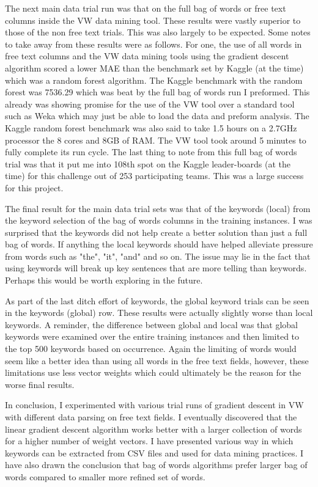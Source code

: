 \documentclass[conference]{IEEEtran}
\begin{document}
The next main data trial run was that on the full bag of words or free text
columns inside the VW data mining tool. These results were vastly superior to
those of the non free text trials. This was also largely to be expected. Some
notes to take away from these results were as follows. For one, the use of all
words in free text columns and the VW data mining tools using the gradient
descent algorithm scored a lower MAE than the benchmark set by Kaggle (at the time) which
was a random forest algorithm. The Kaggle benchmark with the random forest
was 7536.29 which was beat by the full bag of words run I preformed. This
already was showing promise for the use of the VW tool over a standard tool such
as Weka which may just be able to load the data and preform analysis. The
Kaggle random forest benchmark was also said to take 1.5 hours on a 2.7GHz
processor the 8 cores and 8GB of RAM. The VW tool took around 5 minutes to
fully complete its run cycle. The last thing to note from this full bag of words
trial was that it put me into 108th spot on the Kaggle leader-boards (at the time) for this
challenge out of 253 participating teams. This was a large success for this project.

The final result for the main data trial sets was that of the keywords (local) from
the keyword selection of the bag of words columns in the training instances. I was
surprised that the keywords did not help create a better solution than just
a full bag of words. If anything the local keywords should have helped alleviate
pressure from words such as "the", "it", "and" and so on. The issue may lie in
the fact that using keywords will break up key sentences that are more telling
than keywords. Perhaps this would be worth exploring in the future.

As part of the last ditch effort of keywords, the global keyword trials can be
seen in the keywords (global) row. These results were actually slightly worse
than local keywords. A reminder, the difference between global and local was
that global keywords were examined over the entire training instances and then
limited to the top 500 keywords based on occurrence. Again the limiting of
words would seem like a better idea than using all words in the free text fields,
however, these limitations use less vector weights which could ultimately be the
reason for the worse final results.

In conclusion, I experimented with various trial runs of gradient descent in
VW with different data parsing on free text fields. I eventually discovered
that the linear gradient descent algorithm works better with a larger collection
of words for a higher number of weight vectors. I have presented various way
in which keywords can be extracted from CSV files and used for data mining
practices. I have also drawn the conclusion that bag of words algorithms
prefer larger bag of words compared to smaller more refined set of words.

\end{document}

